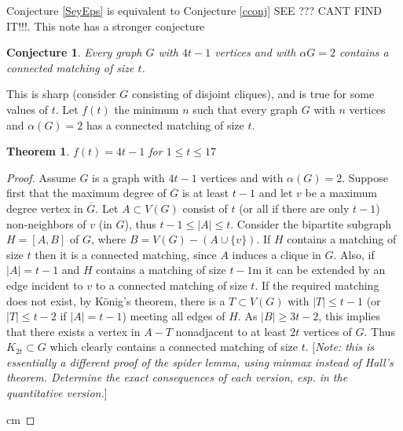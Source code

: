 \documentclass[12 pt]{article}
\newtheorem{conjecture}{Conjecture}
\newtheorem{theorem}{Theorem}
\newcommand{\AG}{$\alpha(G) = 2$\xspace}
\begin{document}
{\begin{bibsection}[References]
\begin{biblist}[\normalsize]
Conjecture \ref{SeyEps} is equivalent to Conjecture \ref{cconj} SEE \cite{DandMimprove}??? CANT FIND IT!!!.  This note has a stronger conjecture
\begin{conjecture}\label{FGSconj}
Every graph $G$ with $4t-1$ vertices and with $\alpha{G} = 2$ contains a connected matching of size $t$.
\end{conjecture}
This is sharp (consider $G$ consisting of disjoint cliques), and is true for some values of $t$.  Let $f(t)$ the minimum $n$ such that every graph $G$ with $n$ vertices and \AG has a connected matching of size $t$. 
\begin{theorem}\label{FGSresult}
$f(t) = 4t-1$ for $1\leq t\leq17$
\end{theorem}
\begin{proof}
	Assume $G$ is a graph with $4t-1$
 vertices and with \AG.  Suppose first that the maximum degree of $\overline{G}$ is at least $t-1$ and let $v$ be a maximum degree vertex in $\overline{G}$.  Let $A\subset V(G)$ consist of $t$ (or all if there are only $t-1$) non-neighbors of $v$ (in $G$), thus $t-1 \leq |A|\leq t$.  Consider the bipartite subgraph $H = [A,B]$ of $G$, where $B= V(G)-(A\cup \{v\})$. If $H$ contains a matching of size $t$ then it is a connected matching, since $A$ induces a clique in $G$.  Also, if $|A| = t-1$ and $H$ contains a matching of size $t-1$m it can be extended by an edge incident to $v$ to a connected matching of size $t$.  If the required matching does not exist, by K\"onig's theorem, there is a $T\subset V(G)$ with $|T| \leq t-1$ (or $|T| \leq t-2$ if $|A| = t-1$) meeting all edges of $H$. As $|B| \geq 3t-2$, this implies that there exists a vertex in $A-T$ nonadjacent to at least $2t$ vertices of $G$.  Thus $K_{2t}\subset G$ which clearly contains a connected matching of size $t$. [{\em Note: this is essentially a different proof of the spider lemma, using minmax instead of Hall's theorem.  Determine the exact consequences of each version, esp. in the quantitative version.}] 

 cm


\end{proof}
\end{biblist}
\end{bibsection}}
\end{document}
